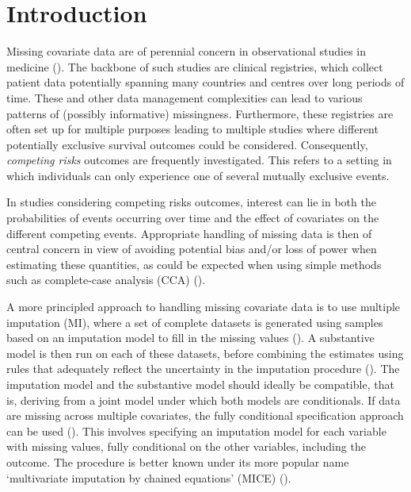 \documentclass[
  letterpaper,
  paper=240mm:170mm,
  twoside=true,
  open=right,
  fontsize=10pt,
  pagesize=false,
  BCOR=15mm,
  DIV=14,
  headinclude=true,
  footinclude=false,
  headsepline=on]{scrbook}
\begin{document}
\clearpage

\section{Introduction}\label{introduction-1}

Missing covariate data are of perennial concern in observational studies
in medicine (). The backbone of such studies are clinical registries,
which collect patient data potentially spanning many countries and
centres over long periods of time. These and other data management
complexities can lead to various patterns of (possibly informative)
missingness. Furthermore, these registries are often set up for multiple
purposes leading to multiple studies where different potentially
exclusive survival outcomes could be considered. Consequently,
\emph{competing risks} outcomes are frequently investigated. This refers
to a setting in which individuals can only experience one of several
mutually exclusive events.

In studies considering competing risks outcomes, interest can lie in
both the probabilities of events occurring over time and the effect of
covariates on the different competing events. Appropriate handling of
missing data is then of central concern in view of avoiding potential
bias and/or loss of power when estimating these quantities, as could be
expected when using simple methods such as complete-case analysis (CCA)
().

A more principled approach to handling missing covariate data is to use
multiple imputation (MI), where a set of complete datasets is generated
using samples based on an imputation model to fill in the missing values
(). A
substantive model is then run on each of these datasets, before
combining the estimates using rules that adequately reflect the
uncertainty in the imputation procedure
(). The imputation model and the
substantive model should ideally be compatible, that is, deriving from a
joint model under which both models are conditionals. If data are
missing across multiple covariates, the fully conditional specification
approach can be used
(). This involves specifying an imputation model for
each variable with missing values, fully conditional on the other
variables, including the outcome. The procedure is better known under
its more popular name `multivariate imputation by chained equations'
(MICE) ().
\end{document}
